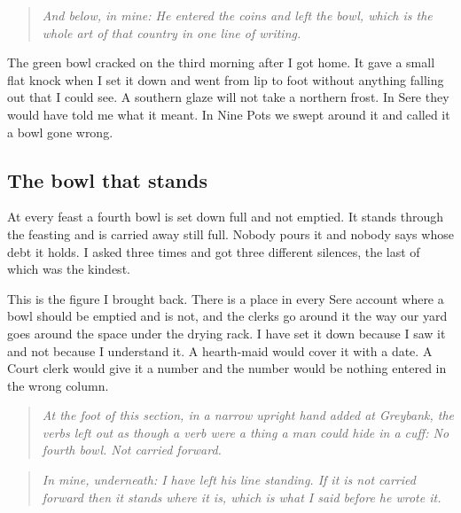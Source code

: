 \documentclass{design/chronicle}
\begin{document}
\begin{quote}\itshape \end{quote}

\begin{quote}\itshape \emph{And below, in mine:} He entered the coins and left the bowl, which is the whole art of that country in one line of writing.\end{quote}

The green bowl cracked on the third morning after I got home. It gave a small flat knock when I set it down and went from lip to foot without anything falling out that I could see. A southern glaze will not take a northern frost. In Sere they would have told me what it meant. In Nine Pots we swept around it and called it a bowl gone wrong.

\subsection*{The bowl that stands}

At every feast a fourth bowl is set down full and not emptied. It stands through the feasting and is carried away still full. Nobody pours it and nobody says whose debt it holds. I asked three times and got three different silences, the last of which was the kindest.

This is the figure I brought back. There is a place in every Sere account where a bowl should be emptied and is not, and the clerks go around it the way our yard goes around the space under the drying rack. I have set it down because I saw it and not because I understand it. A hearth-maid would cover it with a date. A Court clerk would give it a number and the number would be nothing entered in the wrong column.

\begin{quote}\itshape \emph{At the foot of this section, in a narrow upright hand added at Greybank, the verbs left out as though a verb were a thing a man could hide in a cuff:} No fourth bowl. Not carried forward.\end{quote}

\begin{quote}\itshape \end{quote}

\begin{quote}\itshape \emph{In mine, underneath:} I have left his line standing. If it is not carried forward then it stands where it is, which is what I said before he wrote it.\end{quote}
\end{document}
